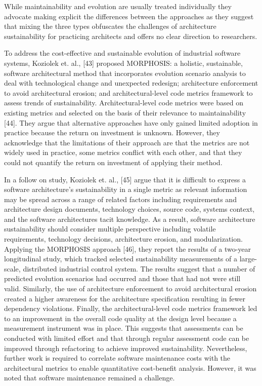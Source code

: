 \documentclass[preprint,12pt,authoryear]{elsarticle}
\begin{document}
While maintainability and evolution are usually treated individually
they advocate making explicit the differences between the approaches
as they suggest that mixing the three types obfuscates the challenges
of architecture sustainability for practicing architects and offers no
clear direction to researchers.

To address the cost-effective and sustainable evolution of industrial
software systems, Koziolek et. al., [43] proposed MORPHOSIS: a
holistic, sustainable, software architectural method that incorporates
evolution scenario analysis to deal with technological change and
unexpected redesign; architecture enforcement to avoid architectural
erosion; and architectural-level code metrics framework to assess
trends of sustainability. Architectural-level code metrics were based
on existing metrics and selected on the basis of their relevance to
maintainability [44]. They argue that alternative approaches have only
gained limited adoption in practice because the return on investment
is unknown. However, they acknowledge that the limitations of their
approach are that the metrics are not widely used in practice, some
metrics conflict with each other, and that they could not quantify the
return on investment of applying their method.

In a follow on study, Koziolek et. al., [45] argue that it is
difficult to express a software architecture’s sustainability in a
single metric as relevant information may be spread across a range of
related factors including requirements and architecture design
documents, technology choices, source code, systems context, and the
software architectures tacit knowledge. As a result, software
architecture sustainability should consider multiple perspective
including volatile requirements, technology decisions, architecture
erosion, and modularization. Applying the MORPHOSIS approach [46],
they report the results of a two-year longitudinal study, which
tracked selected sustainability measurements of a large-scale,
distributed industrial control system. The results suggest that a
number of predicted evolution scenarios had occurred and those that
had not were still valid. Similarly, the use of architecture
enforcement to avoid architectural erosion created a higher awareness
for the architecture specification resulting in fewer dependency
violations. Finally, the architectural-level code metrics framework
led to an improvement in the overall code quality at the design level
because a measurement instrument was in place. This suggests that
assessments can be conducted with limited effort and that through
regular assessment code can be improved through refactoring to achieve
improved sustainability. Nevertheless, further work is required to
correlate software maintenance costs with the architectural metrics to
enable quantitative cost-benefit analysis. However, it was noted that
software maintenance remained a challenge.
\end{document}
